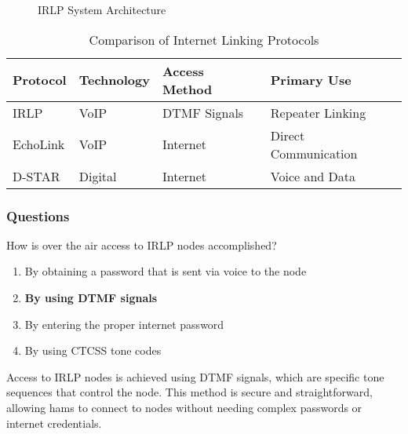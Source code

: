 \begin{figure}[h]
    \centering
    \caption{IRLP System Architecture}
    \label{fig:irlp-architecture}
\end{figure}

\begin{table}[h]
    \centering
    \caption{Comparison of Internet Linking Protocols}
    \label{tab:irlp-comparison}
    \begin{tabular}{|l|l|l|l|}
        \hline
        \textbf{Protocol} & \textbf{Technology} & \textbf{Access Method} & \textbf{Primary Use} \\
        \hline
        IRLP & VoIP & DTMF Signals & Repeater Linking \\
        EchoLink & VoIP & Internet & Direct Communication \\
        D-STAR & Digital & Internet & Voice and Data \\
        \hline
    \end{tabular}
\end{table}

\subsubsection{Questions}

\begin{tcolorbox}[colback=gray!10!white,colframe=black!75!black,title={T8C06}]
    How is over the air access to IRLP nodes accomplished?
    \begin{enumerate}[label=\Alph*),noitemsep]
        \item By obtaining a password that is sent via voice to the node
        \item \textbf{By using DTMF signals}
        \item By entering the proper internet password
        \item By using CTCSS tone codes
    \end{enumerate}
\end{tcolorbox}
Access to IRLP nodes is achieved using DTMF signals, which are specific tone sequences that control the node. This method is secure and straightforward, allowing hams to connect to nodes without needing complex passwords or internet credentials.

